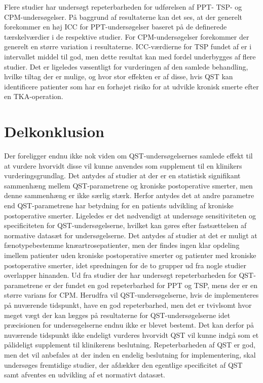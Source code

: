 Flere studier har undersøgt repeterbarheden for udførelsen af PPT- TSP- og CPM-undersøgelser. På baggrund af resultaterne kan det ses, at der generelt forekommer en høj ICC for PPT-undersøgelser baseret på de definerede tærskelværdier i de respektive studier. For CPM-undersøgelser forekommer der generelt en større variation i resultaterne. ICC-værdierne for TSP fundet af  er i intervallet middel til god, men dette resultat kan med fordel underbygges af flere studier. 
Det er ligeledes væsentligt for vurderingen af den samlede behandling, hvilke tiltag der er mulige, og hvor stor effekten er af disse, hvis QST kan identificere patienter som har en forhøjet risiko for at udvikle kronisk smerte efter en TKA-operation.

\section{Delkonklusion}
Der foreligger endnu ikke nok viden om QST-undersøgelsernes samlede effekt til at vurdere hvorvidt disse vil kunne anvendes som supplement til en klinikers vurderingsgrundlag. Det antydes af studier at der er en statistisk signifikant sammenhæng mellem QST-parametrene og kroniske postoperative smerter, men denne sammenhæng er ikke særlig stærk. Herfor antydes det at andre parametre end QST-parametrene har betydning for en patients udvikling af kroniske postoperative smerter. Ligeledes er det nødvendigt at undersøge sensitiviteten og specificiteten for QST-undersøgelserne, hvilket kan gøres efter fastsættelsen af normative datasæt for undersøgelserne. Det antydes af studier at det er muligt at fænotypebestemme knæartrosepatienter, men der findes ingen klar opdeling imellem patienter uden kroniske postoperative smerter og patienter med kroniske postoperative smerter, idet spredningen for de to grupper ud fra nogle studier overlapper hinanden. Ud fra studier der har undersøgt repeterbarheden for QST-parametrene er der fundet en god repeterbarhed for PPT og TSP, mens der er en større varians for CPM. Herudfra vil QST-undersøgelserne, hvis de implementeres på nuværende tidspunkt, have en god repeterbarhed, men det er tvivlsomt hvor meget vægt der kan lægges på resultaterne for QST-undersøgelserne idet præcisionen for undersøgelserne endnu ikke er blevet bestemt. 
Det kan derfor på nuværende tidspunkt ikke endeligt vurderes hvorvidt QST vil kunne indgå som et pålideligt supplement til klinikerens beslutning. Repeterbarheden af QST er god, men det vil anbefales at der inden en endelig beslutning for implementering, skal undersøges fremtidige studier, der afdækker den egentlige specificitet af QST samt afventes en udvikling af et normativt datasæt.

